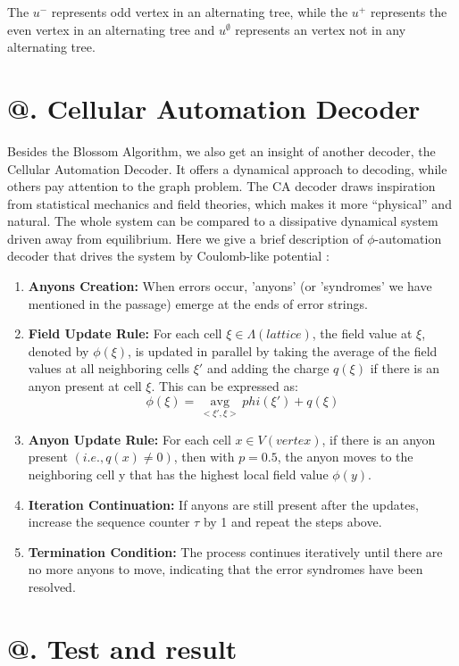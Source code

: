 \documentclass[
    a4paper, %
    10pt, %
    unnumberedsections, %
    twoside, %
]{LTJournalArticle}
\makeatletter
\newcommand{\Rmnum}[1]{\expandafter\@slowromancap\romannumeral #1@}
\makeatother
\begin{document}
    The $u^-$ represents odd vertex in an alternating tree, while the $u^+$ represents the even vertex in an alternating tree and $u^{\emptyset}$ represents an vertex not in any alternating tree.

\section{\Rmnum{4}. Cellular Automation Decoder}
    Besides the Blossom Algorithm, we also get an insight of another decoder, the Cellular Automation Decoder. It offers a dynamical approach to decoding, while others pay attention to the graph problem. The CA decoder draws inspiration from statistical mechanics and field theories, which makes it more “physical” and natural. The whole system can be compared to a dissipative dynamical system driven away from equilibrium. Here we give a brief description of $\phi$-automation decoder that drives the system by Coulomb-like potential \cite{11}: 
\begin{enumerate}
    \item \textbf{Anyons Creation:} When errors occur, 'anyons' (or 'syndromes' we have mentioned in the passage) emerge at the ends of error strings.
    \item \textbf{Field Update Rule:} For each cell $\xi \in \Lambda(lattice)$, the field value at $\xi$, denoted by $\phi(\xi)$, is updated in parallel by taking the average of the field values at all neighboring cells $\xi'$ and adding the charge $q(\xi)$ if there is an anyon present at cell $\xi$. This can be expressed as: $$\phi(\xi) = \mathop{avg}\limits_{<\xi',\xi>}phi(\xi')+q(\xi)$$
    \item \textbf{Anyon Update Rule:} For each cell $x \in V(vertex)$, if there is an anyon present $(i.e.,q(x)\neq 0)$, then with $p=0.5$, the anyon moves to the neighboring cell y that has the highest local field value $\phi(y)$.
    \item \textbf{Iteration Continuation:} If anyons are still present after the updates, increase the sequence counter $\tau$ by 1 and repeat the steps above.
    \item \textbf{Termination Condition:} The process continues iteratively until there are no more anyons to move, indicating that the error syndromes have been resolved.
\end{enumerate}

\section{\Rmnum{5}. Test and result}
\end{document}
